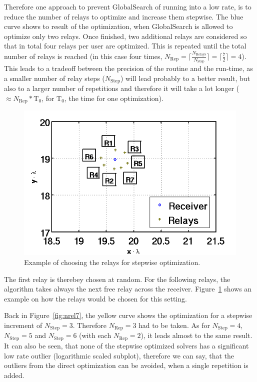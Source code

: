 Therefore one approach to prevent GlobalSearch of running into a low rate, is to reduce the number of relays to optimize and increase them stepwise.
The blue curve shows to result of the optimization, when GlobalSearch is allowed to optimize only two relays.
Once finished, two additional relays are considered so that in total four relays per user are optimized.
This is repeated until the total number of relays is reached (in this case four times, $N_{\text{Rep}} = \lceil\frac{N_{\text{Relays}}}{N_{\text{Step}}}\rceil = \lceil\frac{7}{2}\rceil=4$).
This leads to a tradeoff between the precision of the routine and the run-time, as a smaller number of relay steps ($ N_{\text{Step}}$) will lead probably to a better result, but also to a larger number of repetitions and therefore it will take a lot longer ($\approx N_{\text{Rep}}*\text{T}_0$, for $\text{T}_0$, the time for one optimization).

\begin{figure}[h]
\centering
  \includegraphics[width=0.6\linewidth]{images/choice_of_relays.png}
\caption{Example of choosing the relays for stepwise optimization.}
\label{fig:rel_choice}
\end{figure}

The first relay is therebey chosen at random.
For the following relays, the algorithm takes always the next free relay across the receiver.
Figure~\ref{fig:rel_choice} shows an example on how the relays would be chosen for this setting.

Back in Figure~\ref{fig:nrel7}, the yellow curve shows the optimization for a stepwise increment of $N_{\text{Step}}=3$.
Therefore $N_{\text{Rep}} = 3$ had to be taken.
As for $N_{\text{Step}}=4$, $N_{\text{Step}}=5$ and $N_{\text{Step}}=6$ (with each $N_{\text{Rep}} = 2$), it leads almost to the same result.
It can also be seen, that none of the stepwise optimized solvers has a significant low rate outlier (logarithmic scaled subplot), therefore we can say, that the outliers from the direct optimization can be avoided, when a single repetition is added.


